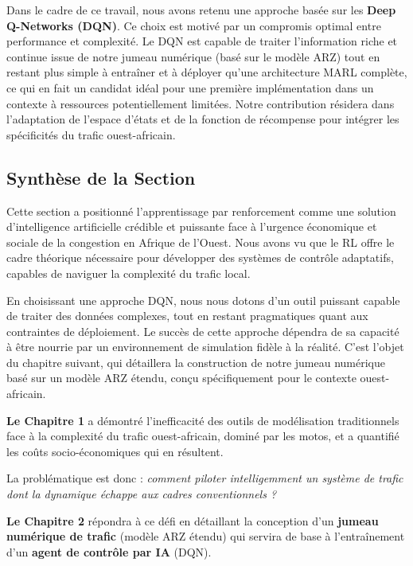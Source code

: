 \begin{choicebox}
    Dans le cadre de ce travail, nous avons retenu une approche basée sur les \textbf{Deep Q-Networks (DQN)}. Ce choix est motivé par un compromis optimal entre performance et complexité. Le DQN est capable de traiter l'information riche et continue issue de notre jumeau numérique (basé sur le modèle ARZ) tout en restant plus simple à entraîner et à déployer qu'une architecture MARL complète, ce qui en fait un candidat idéal pour une première implémentation dans un contexte à ressources potentiellement limitées. Notre contribution résidera dans l'adaptation de l'espace d'états et de la fonction de récompense pour intégrer les spécificités du trafic ouest-africain.
\end{choicebox}

\subsection{Synthèse de la Section}
\label{subsec:rl_conclusion_unifie}

Cette section a positionné l'apprentissage par renforcement comme une solution d'intelligence artificielle crédible et puissante face à l'urgence économique et sociale de la congestion en Afrique de l'Ouest. Nous avons vu que le RL offre le cadre théorique nécessaire pour développer des systèmes de contrôle adaptatifs, capables de naviguer la complexité du trafic local.

En choisissant une approche DQN, nous nous dotons d'un outil puissant capable de traiter des données complexes, tout en restant pragmatiques quant aux contraintes de déploiement. Le succès de cette approche dépendra de sa capacité à être nourrie par un environnement de simulation fidèle à la réalité. C'est l'objet du chapitre suivant, qui détaillera la construction de notre jumeau numérique basé sur un modèle ARZ étendu, conçu spécifiquement pour le contexte ouest-africain.

\begin{synthesisbox}
    \textbf{Le Chapitre 1} a démontré l'inefficacité des outils de modélisation traditionnels face à la complexité du trafic ouest-africain, dominé par les motos, et a quantifié les coûts socio-économiques qui en résultent.

    \vspace{0.2cm}

    La problématique est donc : \textit{comment piloter intelligemment un système de trafic dont la dynamique échappe aux cadres conventionnels ?}

    \vspace{0.2cm}

    \textbf{Le Chapitre 2} répondra à ce défi en détaillant la conception d'un \textbf{jumeau numérique de trafic} (modèle ARZ étendu) qui servira de base à l'entraînement d'un \textbf{agent de contrôle par IA} (DQN).
\end{synthesisbox}
